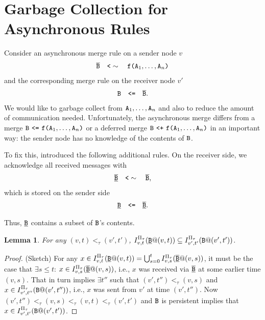 \documentclass{article}
\numberwithin{equation}{section}
\newtheorem{lemma}[theorem]{Lemma}
\renewcommand{\tt}[1]{\ifmmode\text{\texttt{#1}}\else\texttt{#1}\fi}
\begin{document}
\section{Garbage Collection for Asynchronous Rules}
Consider an asynchronous merge rule on a sender node $v$
\begin{align*}
\overline{\tt{B}} \quad\tt{<}\sim\quad \tt{f}\tt{(}\tt{A}_1,\dots,\tt{A}_n\tt{)}
\end{align*}
and the corresponding merge rule on the receiver node $v'$
\begin{align*}
\tt{B} \quad\tt{<=}\quad \overline{\tt{B}}.
\end{align*}
We would like to garbage collect from $\tt{A}_1, \dots, \tt{A}_n$ and also to reduce the amount of communication needed.
Unfortunately, the asynchronous merge differs from a merge $\tt{B} ~\tt{<=}~ \tt{f}\tt{(}\tt{A}_1,\dots,\tt{A}_n\tt{)}$ or a deferred merge $\tt{B} ~\tt{<+}~ \tt{f}\tt{(}\tt{A}_1,\dots,\tt{A}_n\tt{)}$ in an important way:
the sender node has no knowledge of the contents of $\tt{B}$.

To fix this, \cite{conway2014edelweiss} introduced the following additional rules.
On the receiver side, we acknowledge all received messages with
\begin{align*}
\overline{\underline{\tt{B}}} \quad\tt{<}\sim\quad \overline{\tt{B}},
\end{align*}
which is stored on the sender side
\begin{align*}
\underline{\tt{B}} \quad\tt{<=}\quad \overline{\underline{\tt{B}}}.
\end{align*}

Thus, $\underline{\tt{B}}$ contains a subset of $\tt{B}$'s contents.
\begin{lemma}
\label{lem:async_merge_contains}
For any $(v,t) <_\tau (v',t')$, $I^{\Pi_\tau}_{v,t}(\underline{\tt{B}}@(v,t)) \subseteq I^{\Pi_\tau}_{v',t'}(\tt{B}@(v',t'))$.
\end{lemma}
\begin{proof}(Sketch)
For any $x \in I^{\Pi_\tau}_{v,t}(\underline{\tt{B}}@(v,t)) = \bigcup_{s=0}^t I^{\Pi_\tau}_{v,s}(\overline{\underline{\tt{B}}}@(v,s))$, it must be the case that $\exists s \leq t$: $x \in I^{\Pi_\tau}_{v,s}(\overline{\underline{\tt{B}}}@(v,s))$, i.e., $x$ was received via $\overline{\underline{\tt{B}}}$ at some earlier time $(v,s)$.
That in turn implies
$\exists t''$ such that $(v',t'') <_\tau (v,s)$ and $x \in I^{\Pi_\tau}_{v',t''}(\tt{B}@(v',t''))$, i.e., $x$ was sent from $v'$ at time $(v',t'')$.
Now $(v',t'') <_\tau (v,s) <_\tau (v,t) <_\tau (v',t')$ and $\tt{B}$ is persistent implies that $x \in I^{\Pi_\tau}_{v',t'}(\tt{B}@(v',t'))$.
\end{proof}
\end{document}
